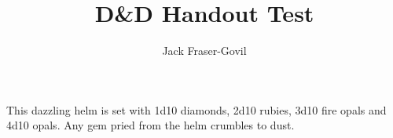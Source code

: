 \documentclass[]{rpghandout}
\title{D\&D Handout Test}
\author{Jack Fraser-Govil}
\begin{document}
    \maketitle

    This dazzling helm is set with 1d10 diamonds, 2d10 rubies, 3d10 fire opals and 4d10 opals. Any gem pried from the helm crumbles to dust.

	\Blindtext
\end{document}

